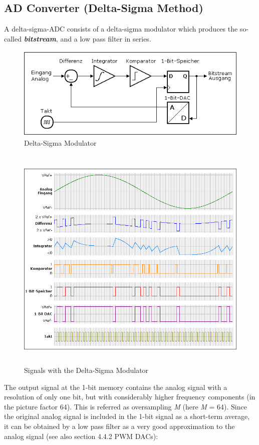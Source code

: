 \subsection{AD Converter (Delta-Sigma Method)}

A delta-sigma-ADC consists of a delta-sigma modulator which produces the so-called \textbf{\textit{bitstream}}, and a low pass filter in series.

    \begin{figure}[h]
    \centering
    \includegraphics[width=12cm, height=4.5cm]{Images/image41.png}
    \caption{Delta-Sigma Modulator}
    \label{fig:Fig 134}
    \end{figure}

    \begin{figure}[h]
    \centering
    \includegraphics[width=15cm, height=11cm]{Images/image42.png}
    \caption{Signals with the Delta-Sigma Modulator}
    \label{fig:Fig 135}
    \end{figure}
    
The output signal at the 1-bit memory contains the analog signal with a resolution of only one bit, but with considerably higher frequency components (in the picture factor 64). This is referred as oversampling \textit{M} (here \textit{M} = 64). Since the original analog signal is included in the 1-bit signal as a short-term average, it can be obtained by a low pass filter as a very good approximation to the analog signal (see also section 4.4.2 PWM DACs):
\newpage

